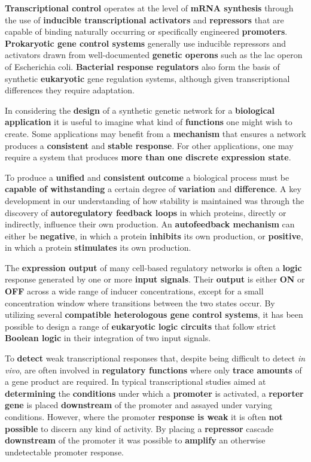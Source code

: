 \documentclass[10pt,a4paper]{report}
\begin{document}
	\textbf{Transcriptional control} operates at the level of \textbf{mRNA synthesis} through the use of \textbf{inducible transcriptional activators} and \textbf{repressors} that are capable of binding naturally occurring or specifically engineered \textbf{promoters}.
	\textbf{Prokaryotic gene control systems} generally use inducible repressors and activators drawn from well-documented \textbf{genetic operons} such as the lac operon of Escherichia coli.
	\textbf{Bacterial response regulators} also form the basis of synthetic \textbf{eukaryotic} gene regulation systems, although given transcriptional differences they require adaptation.
	
	In considering the \textbf{design} of a synthetic genetic network for a \textbf{biological application} it is useful to imagine what kind of \textbf{functions} one might wish to create. 
	Some applications may benefit from a \textbf{mechanism} that ensures a network produces a \textbf{consistent} and \textbf{stable response}.
	For other applications, one may require a system that produces \textbf{more than one discrete expression state}.
	
	To produce a \textbf{unified} and \textbf{consistent} \textbf{outcome} a biological process must be \textbf{capable of withstanding} a certain degree of \textbf{variation} and \textbf{difference}.
	A key development in our understanding of how stability is maintained was through the discovery of \textbf{autoregulatory feedback loops} in which proteins, directly or indirectly, influence their own production.
	An \textbf{autofeedback mechanism} can either be \textbf{negative}, in which a protein \textbf{inhibits} its own production, or \textbf{positive}, in which a protein \textbf{stimulates} its own production.
	
	The \textbf{expression output} of many cell-based regulatory networks is often a \textbf{logic} response generated by one or more \textbf{input signals}.
	Their \textbf{output} is either \textbf{ON} or \textbf{OFF} across a wide range of inducer concentrations, except for a small concentration window where transitions between the two states occur.
	By utilizing several \textbf{compatible heterologous gene control systems}, it has been possible to design a range of \textbf{eukaryotic logic circuits} that follow strict \textbf{Boolean logic} in their integration of two input signals.
	
	To \textbf{detect} weak transcriptional responses that, despite being difficult to detect \textit{in vivo}, are often involved in \textbf{regulatory functions} where only \textbf{trace amounts} of a gene product are required. 
	In typical transcriptional studies aimed at \textbf{determining} the \textbf{conditions} under which a \textbf{promoter} is activated, a \textbf{reporter gene} is placed \textbf{downstream} of the promoter and assayed under varying conditions. 
	However, where the promoter \textbf{response is weak} it is often \textbf{not possible} to discern any kind of activity. 
	By placing a \textbf{repressor} cascade \textbf{downstream} of the promoter it was possible to \textbf{amplify} an otherwise undetectable promoter response.
	
\end{document}

